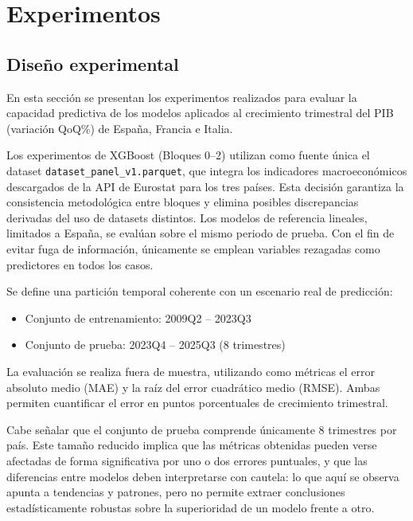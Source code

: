 
\chapter{Experimentos}
\label{experimentos}

\FloatBarrier
\section{Diseño experimental}

En esta sección se presentan los experimentos realizados para evaluar la capacidad predictiva de los modelos aplicados al crecimiento trimestral del PIB (variación QoQ\%) de España, Francia e Italia.

Los experimentos de XGBoost (Bloques 0--2) utilizan como fuente única el dataset \texttt{dataset\_\allowbreak{}panel\_\allowbreak{}v1.parquet}, que integra los indicadores macroeconómicos descargados de la API de Eurostat para los tres países. Esta decisión garantiza la consistencia metodológica entre bloques y elimina posibles discrepancias derivadas del uso de datasets distintos. Los modelos de referencia lineales, limitados a España, se evalúan sobre el mismo periodo de prueba. Con el fin de evitar fuga de información, únicamente se emplean variables rezagadas como predictores en todos los casos.

Se define una partición temporal coherente con un escenario real de predicción:

\begin{itemize}
    \item Conjunto de entrenamiento: 2009Q2 -- 2023Q3
    \item Conjunto de prueba: 2023Q4 -- 2025Q3 (8 trimestres)
\end{itemize}

La evaluación se realiza fuera de muestra, utilizando como métricas el error absoluto medio (MAE) y la raíz del error cuadrático medio (RMSE). Ambas permiten cuantificar el error en puntos porcentuales de crecimiento trimestral.

Cabe señalar que el conjunto de prueba comprende únicamente 8 trimestres por país. Este tamaño reducido implica que las métricas obtenidas pueden verse afectadas de forma significativa por uno o dos errores puntuales, y que las diferencias entre modelos deben interpretarse con cautela: lo que aquí se observa apunta a tendencias y patrones, pero no permite extraer conclusiones estadísticamente robustas sobre la superioridad de un modelo frente a otro.

